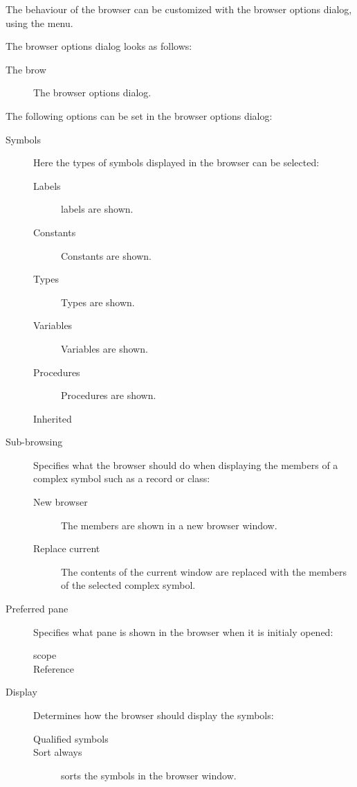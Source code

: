 The behaviour of the browser can be customized with the browser options
dialog, using the  menu.
\begin{htmlonly}
The browser options dialog looks as follows:
\end{htmlonly}
\begin{latexonly}
The brow
\begin{figure}[ht]
\caption{The browser options dialog.}\label{fig:obrowser}
\ifpdf
{}
\else
{}
\fi
\end{figure}
\end{latexonly}
The following options can be set in the browser options dialog:
\begin{description}
\item[Symbols] Here the types of symbols displayed in the browser can be
selected:
\begin{description}
\item[Labels] labels are shown.
\item[Constants] Constants are shown.
\item[Types] Types are shown.
\item[Variables] Variables are shown.
\item[Procedures] Procedures are shown.
\item[Inherited]
\end{description}
\item[Sub-browsing] Specifies what the browser should do when displaying the
members of a complex symbol such as a record or class:
\begin{description}
\item[New browser] The members are shown in a new browser window.
\item[Replace current] The contents of the current window are replaced with
the members of the selected complex symbol.
\end{description}
\item[Preferred pane] Specifies what pane is shown in the browser when it is
initialy opened:
\begin{description}
\item[scope]
\item[Reference]
\end{description}
\item[Display] Determines how the browser should display the symbols:
\begin{description}
\item[Qualified symbols]
\item[Sort always] sorts the symbols in the browser window. 
\end{description}
\end{description}

